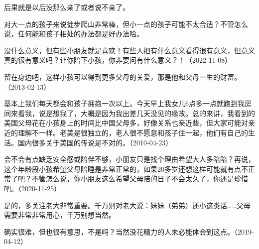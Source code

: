 
后果就是以后没那么亲了或者说不亲了。


对大一点的孩子来说徒步爬山非常棒，但小一点的孩子可能不太合适？不管怎么说，任何能和孩子相处的办法都是好办法哈。


没什么意义，但有些小朋友就是喜欢！有些人把有什么意义看得很有意义，但意义真的很有意义吗？让你陪下小孩，你非要问有什么意义？！（2022-11-08）


留在身边吧，这样小孩可以得到更多父母的关爱，那是他和父母一生的财富。（2013-02-13）


基本上我们每天都会和孩子拥抱一次以上。今天早上我女儿6点多一点就跑到我房间来看我，说是想我了，大概是因为我出差几天没见的缘故。总的来讲，我看到的美国父母花在小孩身上的时间比中国父母多，好像关系也亲近些，但大家可能对亲近的理解不一样。老美是很独立的，老人很不愿意和孩子住一起，他们有自己的生活。国内很多关于美国的传说是不对的。（2010-04-23）


会不会有点缺乏安全感或陪伴不够，小朋友只是找个理由希望大人多陪陪？再说，这个年龄段小孩希望父母陪睡是非常正常的，如果20多岁还想这样可能就有点不正常了吧？不管怎么说，你小朋友这么希望父母陪的日子不会太久了，你还是珍惜吧。（2020-11-25）


是的，多关注老大非常重要。千万别对老大说：妹妹（弟弟）还小这类话……父母需要非常非常用心，千万别想当然。


确实很难，但也很有意思，不是吗？当然没花精力的人未必能体会到这点。（2019-04-12）


